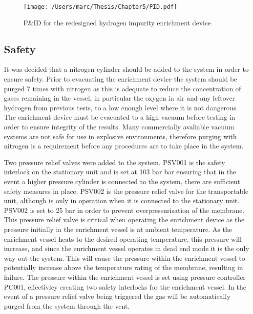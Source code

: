 \begin{landscape}
    \begin{figure}
        \centering
        \texttt{[image: /Users/marc/Thesis/Chapter5/PID.pdf]}
        \caption{P\&ID for the redesigned hydrogen impurity enrichment device}
        \label{hiedpid}
    \end{figure}
    \end{landscape}

\subsection{Safety}

It was decided that a nitrogen cylinder should be added to the system in order to ensure safety. Prior to evacuating the enrichment device the system should be purged 7 times with nitrogen  as this is adequate to reduce the concentration of gases remaining in the vessel, in particular the oxygen in air and any leftover hydrogen from previous tests, to a low enough level where it is not dangerous. \cite{BACQUART20205565} The enrichment device must be evacuated to a high vacuum before testing in order to ensure integrity of the results. Many commercially avaliable vacuum systems are not safe for use in explosive environments, therefore purging with nitrogen is a requirement before any procedures are to take place in the system. 

Two pressure relief valves were added to the system. PSV001 is the safety interlock on the stationary unit and is set at 103 bar bar ensuring that in the event a higher pressure cylinder is connected to the system, there are sufficient safety measures in place. PSV002 is the pressure relief valve for the transportable unit, although is only in operation when it is connected to the stationary unit. PSV002 is set to 25 bar in order to prevent overpressurisation of the membrane. This pressure relief valve is critical when operating the enrichment device as the pressure initially in the enrichment vessel is at ambient temperature. As the enrichment vessel heats to the desired operating temperature, this pressure will increase, and since the enrichment vessel operates in dead end mode it is the only way out the system. This will cause the pressure within the enrichment vessel to potentially increase above the temperature rating of the membrane, resulting in failure. The pressure within the enrichment vessel is set using pressure controller PC001, effectivley creating two safety interlocks for the enrichment vessel. In the event of a pressure relief valve being triggered the gas will be automatically purged from the system through the vent.

